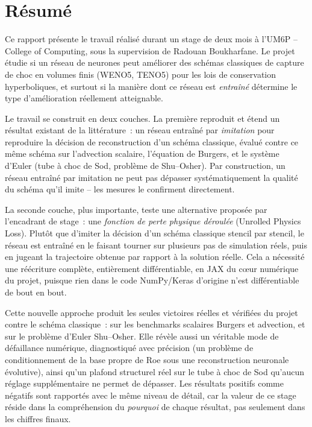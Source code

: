 \documentclass[11pt]{article}
\begin{document}
\tableofcontents
\thispagestyle{plain}
\newpage

\section{Résumé}

Ce rapport présente le travail réalisé durant un stage de deux mois à
l'UM6P -- College of Computing, sous la supervision de Radouan Boukharfane.
Le projet étudie si un réseau de neurones peut améliorer des schémas
classiques de capture de choc en volumes finis (WENO5, TENO5) pour les
lois de conservation hyperboliques, et surtout si la manière dont ce
réseau est \emph{entraîné} détermine le type d'amélioration réellement
atteignable.

Le travail se construit en deux couches. La première reproduit et étend un
résultat existant de la littérature~: un réseau entraîné par
\emph{imitation} pour reproduire la décision de reconstruction d'un schéma
classique, évalué contre ce même schéma sur l'advection scalaire,
l'équation de Burgers, et le système d'Euler (tube à choc de Sod,
problème de Shu--Osher). Par construction, un réseau entraîné par
imitation ne peut pas dépasser systématiquement la qualité du schéma
qu'il imite -- les mesures le confirment directement.

La seconde couche, plus importante, teste une alternative proposée par
l'encadrant de stage~: une \emph{fonction de perte physique déroulée}
(Unrolled Physics Loss). Plutôt que d'imiter la décision d'un schéma
classique stencil par stencil, le réseau est entraîné en le faisant
tourner sur plusieurs pas de simulation réels, puis en jugeant la
trajectoire obtenue par rapport à la solution réelle. Cela a nécessité une
réécriture complète, entièrement différentiable, en JAX du c\oe{}ur numérique
du projet, puisque rien dans le code NumPy/Keras d'origine n'est
différentiable de bout en bout.

Cette nouvelle approche produit les seules victoires réelles et vérifiées
du projet contre le schéma classique~: sur les benchmarks scalaires
Burgers et advection, et sur le problème d'Euler Shu--Osher. Elle révèle
aussi un véritable mode de défaillance numérique, diagnostiqué avec
précision (un problème de conditionnement de la base propre de Roe sous
une reconstruction neuronale évolutive), ainsi qu'un plafond structurel
réel sur le tube à choc de Sod qu'aucun réglage supplémentaire ne permet de
dépasser. Les résultats positifs comme négatifs sont rapportés avec le
même niveau de détail, car la valeur de ce stage réside dans la
compréhension du \emph{pourquoi} de chaque résultat, pas seulement dans
les chiffres finaux.
\end{document}
